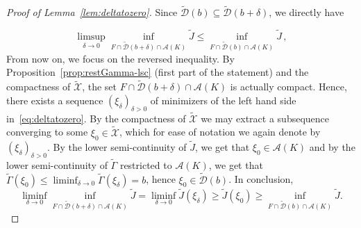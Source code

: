 \documentclass[a4paper,11pt]{amsart}
\numberwithin{equation}{section}
\newcommand{\cA}{{\ensuremath{\mathcal A}} }
\newcommand{\cD}{{\ensuremath{\mathcal D}} }
\newcommand{\cX}{{\ensuremath{\mathcal X}} }
\newcommand{\gd}{\delta}
\renewcommand{\tilde}{\widetilde}          %
\newcommand{\8}{\infty}
\newcommand{\beq}{\begin{equation}}
\newcommand{\eeq}{\end{equation}}
\begin{document}
	\begin{proof}[Proof of Lemma~\ref{lem:deltatozero}] Since $\tilde{\cD}(b)\subseteq \tilde{\cD}(b+\gd)$, we directly have
	
\beq
	\limsup_{\delta\to 0}\inf_{F\cap \tilde{\cD}(b+\gd)\cap\cA(K)} \tilde{J} \le \inf_{F\cap \tilde{\cD}(b)\cap \cA(K)} \tilde{J}\,,
\eeq
From now on, we focus on the reversed inequality.
By Proposition~\ref{prop:restGamma-lsc} (first part of the statement) and the compactness of $\tilde{\cX}$, the set $F\cap\tilde\cD(b+\gd)\cap\cA(K)$ is actually compact. Hence, there exists a sequence $(\xi_\delta)_{\delta>0}$ of minimizers of the left hand side in~\eqref{eq:deltatozero}. By the compactness of $\tilde{\cX}$ we may extract a subsequence converging to some $\xi_0\in\tilde{\cX}$, which for ease of notation we again denote by $(\xi_\delta)_{\delta >0}$. By the lower semi-continuity of $\tilde J$, we get that $\xi_0\in \cA(K)$ and by the lower semi-continuity of $\tilde\Gamma$ restricted to $\cA(K)$, we get that $\tilde\Gamma(\xi_0) \le \liminf_{\gd\to 0} \tilde\Gamma(\xi_\gd) = b$, hence $\xi_0\in \tilde \cD(b)$. In conclusion,
\beq
\liminf_{\delta\to 0}\inf_{F\cap \tilde{\cD}(b+\gd)\cap\cA(K)} \tilde{J}
= \liminf_{\delta\to 0} \tilde{J}(\xi_\gd) \ge \tilde J(\xi_0) \ge \inf_{F\cap \tilde\cD(b)\cap \cA(K)} \tilde J.
\eeq
\end{proof}
\end{document}

